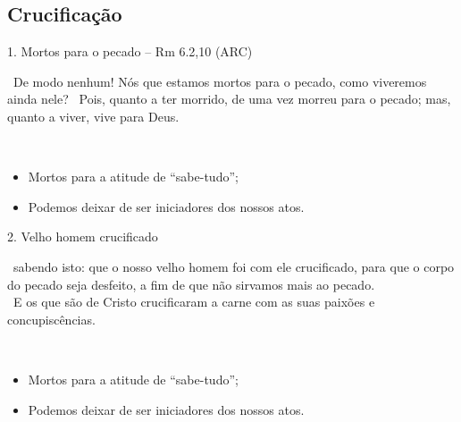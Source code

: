 \documentclass[12pt,aspectratio=169]{beamer}
\newcommand{\ver}[1]{%
    \raisebox{0.50ex}{%
        \scalebox{1.1}{%
            \pmb{\textbf{\textcolor{BSpbg}{#1}}}%
        }%
    }%
}
\newcommand{\QUOTE}[1]{%
    \par\noindent\hspace*{0.05\linewidth}%
    \begin{minipage}{0.9\linewidth}%
        \linespread{1.35}\large{#1}%
    \end{minipage}%
}
\newcommand{\YEL}[1]{{\textcolor{TXyel}{#1}}}
\begin{document}
    \subsection{Crucificação}

    \begin{frame}{1. \YEL{Mortos para o pecado} -- Rm 6.2,10 (ARC)}
        \QUOTE{%
            \ver{2}~De modo nenhum! \YEL{Nós} que \YEL{estamos mortos para o pecado}, como
            viveremos ainda nele?
            \ver{10}~Pois, quanto a ter morrido, de uma vez \YEL{morreu para o pecado}; mas,
            quanto a viver, vive para Deus.
        }
        \\[1.5\bigskipamount]
        \begin{itemize}
            \item<2-> Mortos para a atitude de ``sabe-tudo'';
            \item<3-> Podemos deixar de ser iniciadores dos nossos atos.
        \end{itemize}
    \end{frame}

    \begin{frame}{2. \YEL{Velho homem crucificado}}
        \QUOTE{%
            \ver{Rm 6.6 (ARC)}~sabendo isto: que o nosso velho homem \YEL{foi com ele
            crucificado}, para que o corpo do pecado seja desfeito, a fim de que não sirvamos
            mais ao pecado.
            \\[\bigskipamount]
            \ver{Gl 5.24 (ARC)}~E os que são de Cristo \YEL{crucificaram a carne} com as suas
            paixões e concupiscências.
        }
        \\[1.5\bigskipamount]
        \begin{itemize}
            \item<2-> Mortos para a atitude de ``sabe-tudo'';
            \item<3-> Podemos deixar de ser iniciadores dos nossos atos.
        \end{itemize}
    \end{frame}

\end{document}

